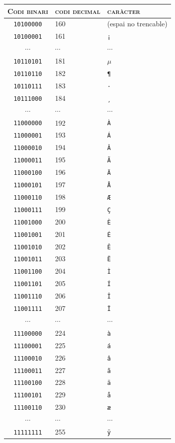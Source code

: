 \begin{table}
\begin{center}
\begin{tabular}{c|l|l}
\hline\hline \textsc{Codi binari} & \textsc{codi decimal} &
\textsc{caràcter} \\
\hline
\texttt{10100000} & 160 & (espai no trencable)  \\
\texttt{10100001} & 161 & \texttt{¡} \\
$\cdots$          & $\cdots$ & $\cdots$ \\
\texttt{10110101} & 181 & $\mathtt{\mu}$ \\
\texttt{10110110} & 182 & \texttt{¶} \\
\texttt{10110111} & 183 & \texttt{·} \\
\texttt{10111000} & 184 & \texttt{¸} \\
$\cdots$          & $\cdots$ & $\cdots$ \\
\texttt{11000000} & 192 & \texttt{À} \\
\texttt{11000001} & 193 & \texttt{Á} \\
\texttt{11000010} & 194 & \texttt{Â} \\
\texttt{11000011} & 195 & \texttt{Ã} \\
\texttt{11000100} & 196 & \texttt{Ä} \\
\texttt{11000101} & 197 & \texttt{Å} \\
\texttt{11000110} & 198 & \texttt{Æ} \\
\texttt{11000111} & 199 & \texttt{Ç} \\
\texttt{11001000} & 200 & \texttt{È} \\
\texttt{11001001} & 201 & \texttt{É} \\
\texttt{11001010} & 202 & \texttt{Ê} \\
\texttt{11001011} & 203 & \texttt{Ë} \\
\texttt{11001100} & 204 & \texttt{Ì} \\
\texttt{11001101} & 205 & \texttt{Í} \\
\texttt{11001110} & 206 & \texttt{Î} \\
\texttt{11001111} & 207 & \texttt{Ï} \\
$\cdots$          & $\cdots$ & $\cdots$ \\
\texttt{11100000} & 224 & \texttt{à} \\
\texttt{11100001} & 225 & \texttt{á} \\
\texttt{11100010} & 226 & \texttt{â} \\
\texttt{11100011} & 227 & \texttt{ã} \\
\texttt{11100100} & 228 & \texttt{ä} \\
\texttt{11100101} & 229 & \texttt{å} \\
\texttt{11100110} & 230 & \texttt{æ} \\
$\cdots$          & $\cdots$ & $\cdots$ \\
\texttt{11111111} & 255 & \texttt{ÿ} \\


\end{tabular}
\end{center}
\end{table}
